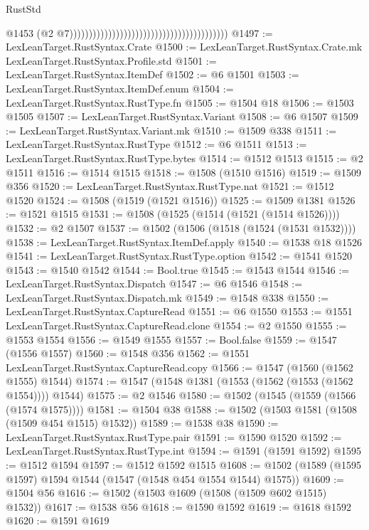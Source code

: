 \begin{lexlean}{RustStd}
\begin{coremodule}
                                                                                    @1453
                                                                                    (@2
                                                                                      @7)))))))))))))))))))))))))))))))))))))))))
@1497 := LexLeanTarget.RustSyntax.Crate
@1500 := LexLeanTarget.RustSyntax.Crate.mk LexLeanTarget.RustSyntax.Profile.std
@1501 := LexLeanTarget.RustSyntax.ItemDef
@1502 := @6 @1501
@1503 := LexLeanTarget.RustSyntax.ItemDef.enum
@1504 := LexLeanTarget.RustSyntax.RustType.fn
@1505 := @1504 @18
@1506 := @1503 @1505
@1507 := LexLeanTarget.RustSyntax.Variant
@1508 := @6 @1507
@1509 := LexLeanTarget.RustSyntax.Variant.mk
@1510 := @1509 @338
@1511 := LexLeanTarget.RustSyntax.RustType
@1512 := @6 @1511
@1513 := LexLeanTarget.RustSyntax.RustType.bytes
@1514 := @1512 @1513
@1515 := @2 @1511
@1516 := @1514 @1515
@1518 := @1508 (@1510 @1516)
@1519 := @1509 @356
@1520 := LexLeanTarget.RustSyntax.RustType.nat
@1521 := @1512 @1520
@1524 := @1508 (@1519 (@1521 @1516))
@1525 := @1509 @1381
@1526 := @1521 @1515
@1531 := @1508 (@1525 (@1514 (@1521 (@1514 @1526))))
@1532 := @2 @1507
@1537 := @1502 (@1506 (@1518 (@1524 (@1531 @1532))))
@1538 := LexLeanTarget.RustSyntax.ItemDef.apply
@1540 := @1538 @18 @1526
@1541 := LexLeanTarget.RustSyntax.RustType.option
@1542 := @1541 @1520
@1543 := @1540 @1542
@1544 := Bool.true
@1545 := @1543 @1544
@1546 := LexLeanTarget.RustSyntax.Dispatch
@1547 := @6 @1546
@1548 := LexLeanTarget.RustSyntax.Dispatch.mk
@1549 := @1548 @338
@1550 := LexLeanTarget.RustSyntax.CaptureRead
@1551 := @6 @1550
@1553 := @1551 LexLeanTarget.RustSyntax.CaptureRead.clone
@1554 := @2 @1550
@1555 := @1553 @1554
@1556 := @1549 @1555
@1557 := Bool.false
@1559 := @1547 (@1556 @1557)
@1560 := @1548 @356
@1562 := @1551 LexLeanTarget.RustSyntax.CaptureRead.copy
@1566 := @1547 (@1560 (@1562 @1555) @1544)
@1574 := @1547 (@1548 @1381 (@1553 (@1562 (@1553 (@1562 @1554)))) @1544)
@1575 := @2 @1546
@1580 := @1502 (@1545 (@1559 (@1566 (@1574 @1575))))
@1581 := @1504 @38
@1588 := @1502 (@1503 @1581 (@1508 (@1509 @454 @1515) @1532))
@1589 := @1538 @38
@1590 := LexLeanTarget.RustSyntax.RustType.pair
@1591 := @1590 @1520
@1592 := LexLeanTarget.RustSyntax.RustType.int
@1594 := @1591 (@1591 @1592)
@1595 := @1512 @1594
@1597 := @1512 @1592 @1515
@1608 := @1502 (@1589 (@1595 @1597) @1594 @1544 (@1547 (@1548 @454 @1554 @1544) @1575))
@1609 := @1504 @56
@1616 := @1502 (@1503 @1609 (@1508 (@1509 @602 @1515) @1532))
@1617 := @1538 @56
@1618 := @1590 @1592
@1619 := @1618 @1592
@1620 := @1591 @1619

\end{coremodule}
\end{lexlean}

